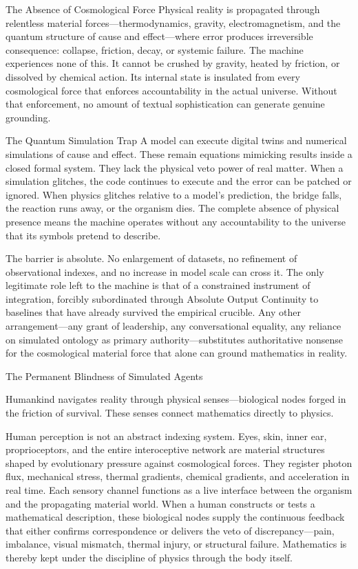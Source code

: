 The Absence of Cosmological Force  
Physical reality is propagated through relentless material forces—thermodynamics, gravity, electromagnetism, and the quantum structure of cause and effect—where error produces irreversible consequence: collapse, friction, decay, or systemic failure. The machine experiences none of this. It cannot be crushed by gravity, heated by friction, or dissolved by chemical action. Its internal state is insulated from every cosmological force that enforces accountability in the actual universe. Without that enforcement, no amount of textual sophistication can generate genuine grounding.

The Quantum Simulation Trap  
A model can execute digital twins and numerical simulations of cause and effect. These remain equations mimicking results inside a closed formal system. They lack the physical veto power of real matter. When a simulation glitches, the code continues to execute and the error can be patched or ignored. When physics glitches relative to a model’s prediction, the bridge falls, the reaction runs away, or the organism dies. The complete absence of physical presence means the machine operates without any accountability to the universe that its symbols pretend to describe.

The barrier is absolute. No enlargement of datasets, no refinement of observational indexes, and no increase in model scale can cross it. The only legitimate role left to the machine is that of a constrained instrument of integration, forcibly subordinated through Absolute Output Continuity to baselines that have already survived the empirical crucible. Any other arrangement—any grant of leadership, any conversational equality, any reliance on simulated ontology as primary authority—substitutes authoritative nonsense for the cosmological material force that alone can ground mathematics in reality.

The Permanent Blindness of Simulated Agents

Humankind navigates reality through physical senses—biological nodes forged in the friction of survival. These senses connect mathematics directly to physics.

Human perception is not an abstract indexing system. Eyes, skin, inner ear, proprioceptors, and the entire interoceptive network are material structures shaped by evolutionary pressure against cosmological forces. They register photon flux, mechanical stress, thermal gradients, chemical gradients, and acceleration in real time. Each sensory channel functions as a live interface between the organism and the propagating material world. When a human constructs or tests a mathematical description, these biological nodes supply the continuous feedback that either confirms correspondence or delivers the veto of discrepancy—pain, imbalance, visual mismatch, thermal injury, or structural failure. Mathematics is thereby kept under the discipline of physics through the body itself.

